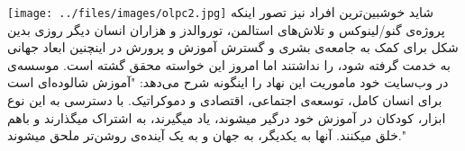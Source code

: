 \texttt{[image: ../files/images/olpc2.jpg]}
شاید خوشبین‌ترین افراد نیز تصور اینکه پروژه‌ی گنو/لینوکس و تلاش‌های استالمن، توروالدز و هزاران انسان دیگر روزی بدین شکل برای کمک به جامعه‌ی بشری و گسترش آموزش و پرورش در اینچنین ابعاد جهانی به خدمت گرفته شود، را نداشتند اما امروز این خواسته محقق گشته است. موسسه‌ی 
 در وب‌سایت خود ماموریت این نهاد را اینگونه شرح می‌دهد:
"آموزش شالوده‌ای است برای انسان کامل، توسعه‌ی اجتماعی، اقتصادی و دموکراتیک. با دسترسی به این نوع ابزار، کودکان در آموزش خود درگیر میشوند، یاد میگیرند، به اشتراک میگذارند و باهم خلق میکنند. آنها به یکدیگر، به جهان و به یک آینده‌ی روشن‌تر ملحق میشوند."
\begin{center}
	\begin{figure}[H] 
		\hfill 
	\end{figure}
\end{center}




